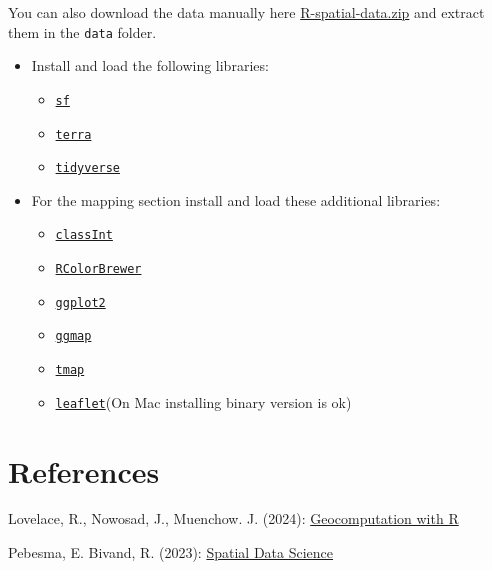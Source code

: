 \documentclass[
]{book}
\providecommand{\tightlist}{%
  \setlength{\itemsep}{0pt}\setlength{\parskip}{0pt}}
\begin{document}
You can also download the data manually here \href{https://github.com/cengel/R-spatial/raw/master/data/R-spatial-data.zip}{R-spatial-data.zip} and extract them in the \texttt{data} folder.

\begin{itemize}
\tightlist
\item
  Install and load the following libraries:

  \begin{itemize}
  \tightlist
  \item
    \href{https://cran.r-project.org/package=sf}{\texttt{sf}}
  \item
    \href{https://cran.r-project.org/package=terra}{\texttt{terra}}
  \item
    \href{https://cran.r-project.org/package=tidyverse}{\texttt{tidyverse}}
  \end{itemize}
\item
  For the mapping section install and load these additional libraries:

  \begin{itemize}
  \tightlist
  \item
    \href{https://cran.r-project.org/package=classInt}{\texttt{classInt}}
  \item
    \href{https://cran.r-project.org/package=RColorBrewer}{\texttt{RColorBrewer}}
  \item
    \href{https://cran.r-project.org/package=ggplot2}{\texttt{ggplot2}}
  \item
    \href{https://cran.r-project.org/package=ggmap}{\texttt{ggmap}}
  \item
    \href{https://cran.r-project.org/package=tmap}{\texttt{tmap}}
  \item
    \href{https://cran.r-project.org/package=leaflet}{\texttt{leaflet}}(On Mac installing binary version is ok)
  \end{itemize}
\end{itemize}

\hypertarget{references}{%
\section*{References}\label{references}}

Lovelace, R., Nowosad, J., Muenchow. J. (2024): \href{https://r.geocompx.org/}{Geocomputation with R}

Pebesma, E. Bivand, R. (2023): \href{https://r-spatial.org/book/}{Spatial Data Science}
\end{document}
